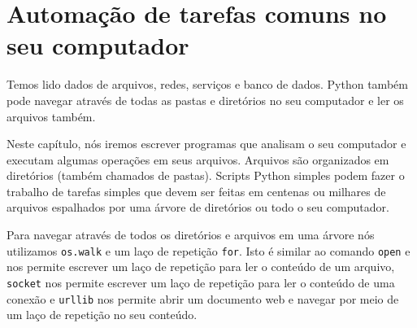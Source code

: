 
\chapter{Automação de tarefas comuns no seu computador}

Temos lido dados de arquivos, redes, serviços e banco de dados.
Python também pode navegar através de todas as pastas e diretórios 
no seu computador e ler os arquivos também.

Neste capítulo, nós iremos escrever programas que analisam o seu computador e executam algumas operações em seus arquivos. Arquivos são organizados em diretórios (também chamados de pastas).
Scripts Python simples podem fazer o trabalho de tarefas simples que devem ser feitas em
centenas ou milhares de arquivos espalhados por uma árvore de diretórios ou todo o seu computador.

Para navegar através de todos os diretórios e arquivos em uma árvore nós utilizamos 
{\tt os.walk} e um laço de repetição {\tt for}. Isto é similar ao comando {\tt open} e nos permite escrever um laço de repetição para ler o conteúdo de um arquivo, {\tt socket} nos permite escrever um laço de repetição para ler o conteúdo de uma conexão e {\tt urllib} nos permite abrir um documento web e navegar por meio de um laço de repetição no seu conteúdo. 

